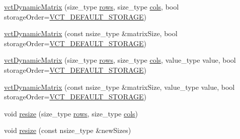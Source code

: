 \begin{DoxyCompactItemize}
\item 
\hyperlink{classvct_dynamic_matrix_ae693edccbffb21855743074d733647c4}{vct\+Dynamic\+Matrix} (size\+\_\+type \hyperlink{classvct_dynamic_const_matrix_base_a5eac13be2207ebeb8766cde379d73438}{rows}, size\+\_\+type \hyperlink{classvct_dynamic_const_matrix_base_aa6c51d41a100da49a7e7ac7edb20ecd9}{cols}, bool storage\+Order=\hyperlink{vct_forward_declarations_8h_aacdb3b0140beef8a3c2025b808b74a73}{V\+C\+T\+\_\+\+D\+E\+F\+A\+U\+L\+T\+\_\+\+S\+T\+O\+R\+A\+G\+E})
\item 
\hyperlink{classvct_dynamic_matrix_a108e3e9ede047d49e714c30a7eea4807}{vct\+Dynamic\+Matrix} (const nsize\+\_\+type \&matrix\+Size, bool storage\+Order=\hyperlink{vct_forward_declarations_8h_aacdb3b0140beef8a3c2025b808b74a73}{V\+C\+T\+\_\+\+D\+E\+F\+A\+U\+L\+T\+\_\+\+S\+T\+O\+R\+A\+G\+E})
\end{DoxyCompactItemize}

{\bf }\par
\begin{DoxyCompactItemize}
\item 
\hyperlink{classvct_dynamic_matrix_ae76b313f74cb7444e8b43a2d55a3378d}{vct\+Dynamic\+Matrix} (size\+\_\+type \hyperlink{classvct_dynamic_const_matrix_base_a5eac13be2207ebeb8766cde379d73438}{rows}, size\+\_\+type \hyperlink{classvct_dynamic_const_matrix_base_aa6c51d41a100da49a7e7ac7edb20ecd9}{cols}, value\+\_\+type value, bool storage\+Order=\hyperlink{vct_forward_declarations_8h_aacdb3b0140beef8a3c2025b808b74a73}{V\+C\+T\+\_\+\+D\+E\+F\+A\+U\+L\+T\+\_\+\+S\+T\+O\+R\+A\+G\+E})
\item 
\hyperlink{classvct_dynamic_matrix_abf3c0073adb839af415346daa49f4fe2}{vct\+Dynamic\+Matrix} (const nsize\+\_\+type \&matrix\+Size, value\+\_\+type value, bool storage\+Order=\hyperlink{vct_forward_declarations_8h_aacdb3b0140beef8a3c2025b808b74a73}{V\+C\+T\+\_\+\+D\+E\+F\+A\+U\+L\+T\+\_\+\+S\+T\+O\+R\+A\+G\+E})
\end{DoxyCompactItemize}

{\bf }\par
\begin{DoxyCompactItemize}
\item 
void \hyperlink{classvct_dynamic_matrix_a19c796adf2f314ce0f45be1c47c01581}{resize} (size\+\_\+type \hyperlink{classvct_dynamic_const_matrix_base_a5eac13be2207ebeb8766cde379d73438}{rows}, size\+\_\+type \hyperlink{classvct_dynamic_const_matrix_base_aa6c51d41a100da49a7e7ac7edb20ecd9}{cols})
\item 
void \hyperlink{classvct_dynamic_matrix_a3bbbede5887b2ac73294ced2e516d72a}{resize} (const nsize\+\_\+type \&new\+Sizes)
\end{DoxyCompactItemize}

